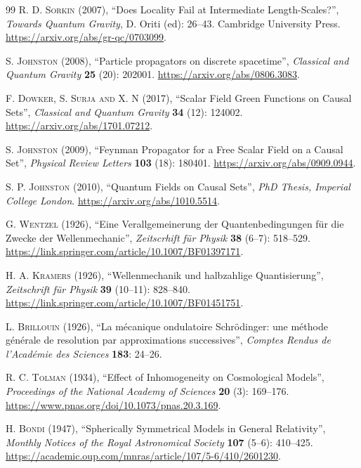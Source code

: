 \documentclass{article}
\begin{document}
\begin{thebibliography}{99}
\textsc{R. D. Sorkin} (2007), ``Does Locality Fail at Intermediate Length-Scales?'', \textit{Towards Quantum Gravity}, D. Oriti (ed): 26--43. Cambridge University Press. \url{https://arxiv.org/abs/gr-qc/0703099}.

\textsc{S. Johnston} (2008), ``Particle propagators on discrete spacetime'', \textit{Classical and Quantum Gravity} \textbf{25} (20): 202001. \url{https://arxiv.org/abs/0806.3083}.

\textsc{F. Dowker, S. Surja and X. N} (2017), ``Scalar Field Green Functions on Causal Sets'', \textit{Classical and Quantum Gravity} \textbf{34} (12): 124002. \url{https://arxiv.org/abs/1701.07212}.

\textsc{S. Johnston} (2009), ``Feynman Propagator for a Free Scalar Field on a Causal Set'', \textit{Physical Review Letters} \textbf{103} (18): 180401. \url{https://arxiv.org/abs/0909.0944}.

\textsc{S. P. Johnston} (2010), ``Quantum Fields on Causal Sets'', \textit{PhD Thesis, Imperial College London}. \url{https://arxiv.org/abs/1010.5514}.

\textsc{G. Wentzel} (1926),  ``Eine Verallgemeinerung der Quantenbedingungen f\"ur die Zwecke der Wellenmechanic'', \textit{Zeitscrhift f\"ur Physik} \textbf{38} (6--7): 518--529. \url{https://link.springer.com/article/10.1007/BF01397171}.

\textsc{H. A. Kramers} (1926), ``Wellenmechanik und halbzahlige Quantisierung'', \textit{Zeitschrift f\"ur Physik} \textbf{39} (10--11): 828--840. \url{https://link.springer.com/article/10.1007/BF01451751}.

\textsc{L. Brillouin} (1926), ``La m\'ecanique ondulatoire Schr\"odinger: une m\'ethode g\'en\'erale de resolution par approximations successives'', \textit{Comptes Rendus de l'Acad\'emie des Sciences} \textbf{183}: 24--26.

\textsc{R. C. Tolman} (1934), ``Effect of Inhomogeneity on Cosmological Models'', \textit{Proceedings of the National Academy of Sciences} \textbf{20} (3): 169--176. \url{https://www.pnas.org/doi/10.1073/pnas.20.3.169}.

\textsc{H. Bondi} (1947), ``Spherically Symmetrical Models in General Relativity'', \textit{Monthly Notices of the Royal Astronomical Society} \textbf{107} (5--6): 410--425. \url{https://academic.oup.com/mnras/article/107/5-6/410/2601230}.


\end{thebibliography}
\end{document}
